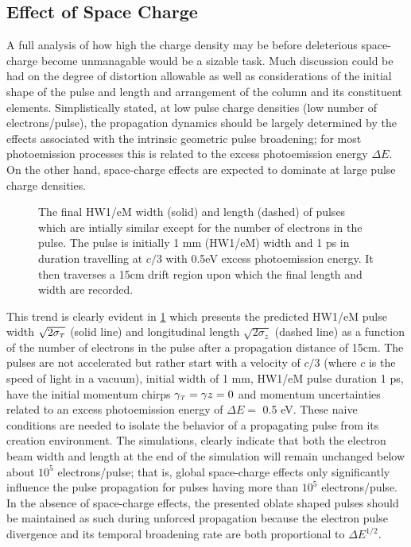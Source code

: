 \subsection{Effect of Space Charge} \label{sec:free_spacecharge}

A full analysis of how high the charge density may be before deleterious space-charge become unmanagable would be a sizable task.
Much discussion could be had on the degree of distortion allowable as well as considerations of the initial shape of the pulse and length and arrangement of the column and its constituent elements.
Simplistically stated, at low pulse charge densities (low number of electrons/pulse), the propagation dynamics should be largely determined by the effects associated with the intrinsic geometric pulse broadening; for most photoemission processes this is related to the excess photoemission energy $\Delta E$.
On the other hand, space-charge effects are expected to dominate at large pulse charge densities.

\begin{figure}
  \centering
  \begin{tikzpicture}
    
  \end{tikzpicture}
  \caption[Simplistic free-space pulse evolution vs charge density]{
    The final HW1/eM width (solid) and length (dashed) of pulses which are intially similar except for the number of electrons in the pulse.
    The pulse is initially 1 mm (HW1/eM) width and 1 ps in duration travelling at $c/3$ with 0.5eV excess photoemission energy.
    It then traverses a 15cm drift region upon which the final length and width are recorded.
  }
  \label{fig:spacecharge_noacc}
\end{figure}

This trend is clearly evident in \ref{fig:spacecharge_noacc} which presents the predicted HW1/eM pulse width $\sqrt{2 \sigma_{\smallT}}$ (solid line) and longitudinal length $\sqrt{2 \sigma_{z}}$ (dashed line) as a function of the number of electrons in the pulse after a propagation distance of 15cm.
The pulses are not accelerated but rather start with a velocity of $c/3$ (where $c$ is the speed of light in a vacuum), initial width of 1 mm, HW1/eM pulse duration 1 ps, have the initial momentum chirps $\gamma_{\smallT} = \gamma{z} = 0 $ and momentum uncertainties related to an excess photoemission energy of $\Delta E = $ 0.5 eV.
These naive conditions are needed to isolate the behavior of a propagating pulse from its creation environment.
The simulations, clearly indicate that both the electron beam width and length at the end of the simulation will remain unchanged below about $10^5$ electrons/pulse; that is, global space-charge effects only significantly influence the pulse propagation for pulses having more than $10^5$ electrons/pulse.
In the absence of space-charge effects, the presented oblate shaped pulses should be maintained as such during unforced propagation because the electron pulse divergence and its temporal broadening rate are both proportional to $\Delta E^{1/2}$.

